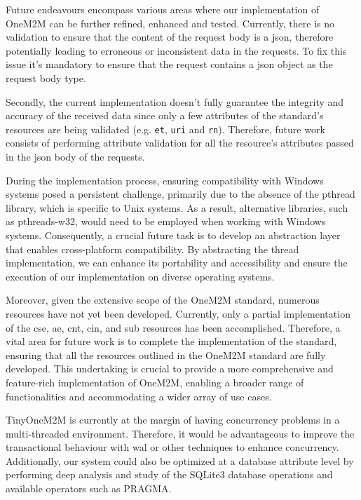 \documentclass[a4paper,fleqn]{cas-dc}
\begin{document}
Future endeavours encompass various areas where our implementation of OneM2M can be further refined, enhanced and tested. Currently, there is no validation to ensure that the content of the request body is a \gls{json}, therefore potentially leading to erroneous or inconsistent data in the requests. To fix this issue it's mandatory to ensure that the request contains a \gls{json} object as the request body type. 

Secondly, the current implementation doesn't fully guarantee the integrity and accuracy of the received data since only a few attributes of the standard's resources are being validated (e.g. \texttt{et}, \texttt{uri} and \texttt{rn}). Therefore, future work consists of performing attribute validation for all the resource's attributes passed in the \gls{json} body of the requests.

During the implementation process, ensuring compatibility with Windows systems posed a persistent challenge, primarily due to the absence of the pthread library, which is specific to Unix systems. As a result, alternative libraries, such as pthreads-w32, would need to be employed when working with Windows systems. Consequently, a crucial future task is to develop an abstraction layer that enables cross-platform compatibility. By abstracting the thread implementation, we can enhance its portability and accessibility and ensure the execution of our implementation on diverse operating systems.

Moreover, given the extensive scope of the OneM2M standard, numerous resources have not yet been developed. Currently, only a partial implementation of the \gls{cse}, \gls{ae}, \gls{cnt}, \gls{cin}, and \gls{sub} resources has been accomplished. Therefore, a vital area for future work is to complete the implementation of the standard, ensuring that all the resources outlined in the OneM2M standard are fully developed. This undertaking is crucial to provide a more comprehensive and feature-rich implementation of OneM2M, enabling a broader range of functionalities and accommodating a wider array of use cases.

TinyOneM2M is currently at the margin of having concurrency problems in a multi-threaded environment. Therefore, it would be advantageous to improve the transactional behaviour with \gls{wal} or other techniques to enhance concurrency. Additionally, our system could also be optimized at a database attribute level by performing deep analysis and study of the SQLite3 database operations and available operators such as PRAGMA.
\end{document}
